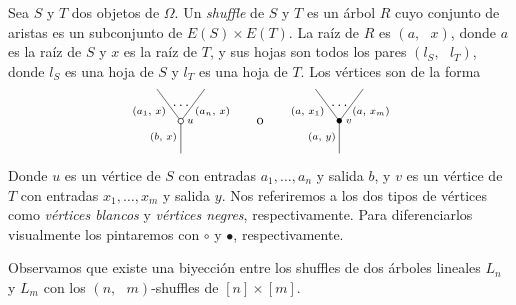 \documentclass[../main.tex]{subfiles}
\begin{document}
\begin{defi}
    Sea $S$ y $T$ dos objetos de $\Omega$. Un \emph{shuffle} de $S$ y $T$ es un \'arbol $R$ cuyo conjunto de aristas es un subconjunto de $E(S)\times E(T)$. La ra\'iz de $R$ es $(a,\text{ }x)$, donde $a$ es la ra\'iz de $S$ y $x$ es la ra\'iz de $T$,
    y sus hojas son todos los pares $(l_S,\text{ }l_T)$, donde $l_S$ es una hoja de $S$ y $l_T$ es una hoja de $T$. Los v\'ertices son de la forma
    $$
        \xy
        <0.08cm, 0cm>:
        (0.0, 0.0)*{}="1"; %
        (0.0, 10.0)*\cir<2pt>{}="2"; %
        (-7.5, 20.0)*{}="3"; %
        (7.5, 20.0)*{}="4"; %
        "1";"2" **\dir{-};
        "2";"3" **\dir{-};
        "2";"4" **\dir{-};
        (3.0, 10.0)*=0{\scriptstyle u};
        (-5.5, 5)*=0{\scriptstyle (b,\text{ }x)};
        (-10, 13.0)*=0{\scriptstyle (a_1,\text{ }x)};
        (10, 13.0)*=0{\scriptstyle (a_n,\text{ }x)};
        (0,15)*{\dots};
        \endxy
        \xy
        <0.08cm, 0cm>:
        (-15, 0.0)*{}="1";
        (15, 10.0)*{}="2";
        (0,10)*{\rm o};
        \endxy
        \xy
        <0.08cm, 0cm>:
        (0.0, 0.0)*{}="1"; %
        (0.0, 10.0)*=0{\bullet}="2"; %
        (-7.5, 20.0)*{}="3"; %
        (7.5, 20.0)*{}="4"; %
        "1";"2" **\dir{-};
        "2";"3" **\dir{-};
        "2";"4" **\dir{-};
        (3.0, 10.0)*=0{\scriptstyle v};
        (-5.5, 5)*=0{\scriptstyle (a,\text{ }y)};
        (-10, 13.0)*=0{\scriptstyle (a,\text{ }x_1)};
        (10, 13.0)*=0{\scriptstyle (a,\text{ }x_m)};
        (0,15)*{\dots};
        \endxy
    $$
    Donde $u$ es un v\'ertice de $S$ con entradas $a_1,\dots,a_n$ y salida $b$, y $v$ es un v\'ertice de $T$ con entradas $x_1,\dots,x_m$ y salida $y$. Nos referiremos a los dos tipos de v\'ertices como \emph{v\'ertices blancos} y \emph{v\'ertices negres}, respectivamente. Para diferenciarlos visualmente los pintaremos con $\circ$ y $\bullet$, respectivamente.

    Observamos que existe una biyecci\'on entre los shuffles de dos \'arboles lineales $L_n$ y $L_m$ con los $(n,\text{ }m)$-shuffles de $[n]\times[m]$.
\end{defi}
\end{document}
